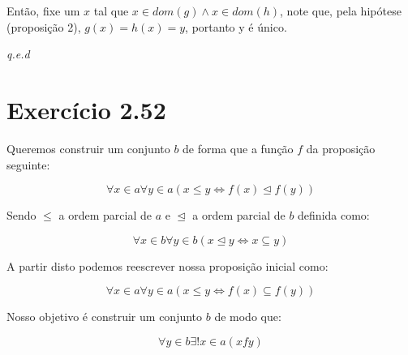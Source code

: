 \documentclass[12pt]{extarticle}
\newcommand{\fim}{\begin{flushright}

   \emph{q.e.d}
\end{flushright}}
\begin{document}
Então, fixe um $x$ tal que $x \in dom(g) \land x \in dom(h)$, note que, pela hipótese (proposição 2), $g(x) = h(x) = y$, portanto y é único.

\fim

\section{Exercício 2.52}

Queremos construir um conjunto $b$ de forma que a função $f$ da proposição seguinte:

$$
\forall x \in a \forall y \in a (x \leq y \Leftrightarrow f(x) \trianglelefteq f(y))
$$

Sendo $\leq$ a ordem parcial de $a$ e $\trianglelefteq$ a ordem parcial de $b$ definida como:

$$
\forall x \in b \forall y \in b (x \trianglelefteq y \Leftrightarrow x \subseteq y)
$$

A partir disto podemos reescrever nossa proposição inicial como:

$$
\forall x \in a \forall y \in a (x \leq y \Leftrightarrow f(x) \subseteq f(y))
$$

Nosso objetivo é construir um conjunto $b$ de modo que:

$$
\forall y \in b \exists ! x \in a (xfy)
$$
\end{document}
